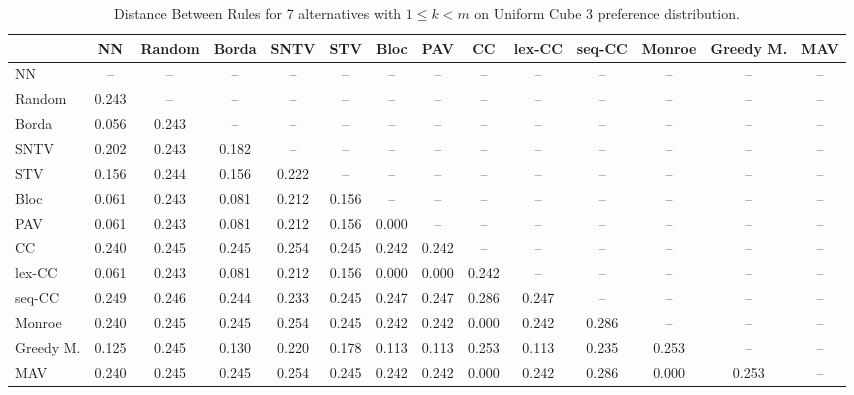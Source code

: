 
\begin{table*}
\centering
\begin{tabular}{lccccccccccccc}
\toprule
 & NN & Random & Borda & SNTV & STV & Bloc & PAV & CC & lex-CC & seq-CC & Monroe & Greedy M. & MAV \\
\midrule
NN & -- & -- & -- & -- & -- & -- & -- & -- & -- & -- & -- & -- & -- \\
Random & 0.243 & -- & -- & -- & -- & -- & -- & -- & -- & -- & -- & -- & -- \\
Borda & 0.056 & 0.243 & -- & -- & -- & -- & -- & -- & -- & -- & -- & -- & -- \\
SNTV & 0.202 & 0.243 & 0.182 & -- & -- & -- & -- & -- & -- & -- & -- & -- & -- \\
STV & 0.156 & 0.244 & 0.156 & 0.222 & -- & -- & -- & -- & -- & -- & -- & -- & -- \\
Bloc & 0.061 & 0.243 & 0.081 & 0.212 & 0.156 & -- & -- & -- & -- & -- & -- & -- & -- \\
PAV & 0.061 & 0.243 & 0.081 & 0.212 & 0.156 & 0.000 & -- & -- & -- & -- & -- & -- & -- \\
CC & 0.240 & 0.245 & 0.245 & 0.254 & 0.245 & 0.242 & 0.242 & -- & -- & -- & -- & -- & -- \\
lex-CC & 0.061 & 0.243 & 0.081 & 0.212 & 0.156 & 0.000 & 0.000 & 0.242 & -- & -- & -- & -- & -- \\
seq-CC & 0.249 & 0.246 & 0.244 & 0.233 & 0.245 & 0.247 & 0.247 & 0.286 & 0.247 & -- & -- & -- & -- \\
Monroe & 0.240 & 0.245 & 0.245 & 0.254 & 0.245 & 0.242 & 0.242 & 0.000 & 0.242 & 0.286 & -- & -- & -- \\
Greedy M. & 0.125 & 0.245 & 0.130 & 0.220 & 0.178 & 0.113 & 0.113 & 0.253 & 0.113 & 0.235 & 0.253 & -- & -- \\
MAV & 0.240 & 0.245 & 0.245 & 0.254 & 0.245 & 0.242 & 0.242 & 0.000 & 0.242 & 0.286 & 0.000 & 0.253 & -- \\
\bottomrule
\end{tabular}

\caption{Distance Between Rules for 7 alternatives with $1 \leq k < m$ on Uniform Cube 3 preference distribution.}
\end{table*}
